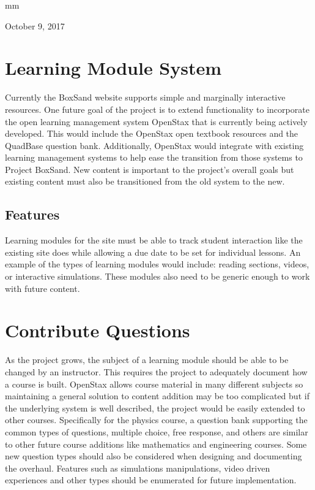 \documentclass[10pt,journal,compsoc,draftclsnofoot,onecolumn]{IEEEtran}
\begin{document}
\hfill mm
 
\hfill October 9, 2017

\section{Learning Module System}
Currently the BoxSand website supports simple and marginally interactive resources. One future goal of the project is to extend functionality to incorporate the open learning management system OpenStax that is currently being actively developed. This would include the OpenStax open textbook resources and the QuadBase question bank. Additionally, OpenStax would integrate with existing learning management systems to help ease the transition from those systems to Project BoxSand. New content is important to the project's overall goals but existing content must also be transitioned from the old system to the new. 

\subsection{Features}
Learning modules for the site must be able to track student interaction like the existing site does while allowing a due date to be set for individual lessons. An example of the types of learning modules would include: reading sections, videos, or interactive simulations. These modules also need to be generic enough to work with future content. 

\section{Contribute Questions}
As the project grows, the subject of a learning module should be able to be changed by an instructor. This requires the project to adequately document how a course is built. OpenStax allows course material in many different subjects so maintaining a general solution to content addition may be too complicated but if the underlying system is well described, the project would be easily extended to other courses. Specifically for the physics course, a question bank supporting the common types of questions, multiple choice, free response, and others are similar to other future course additions like mathematics and engineering courses. Some new question types should also be considered when designing and documenting the overhaul. Features such as simulations manipulations, video driven experiences and other types should be enumerated for future implementation. 
\end{document}
